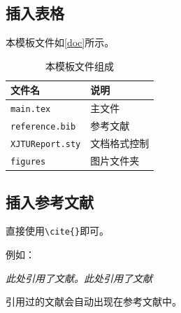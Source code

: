 \documentclass[12pt,hyperref,a4paper,UTF8]{ctexart}
\begin{document}

\subsection{插入表格}
本模板文件如\autoref{doc}所示。
\begin{table}[!htbp]
    \centering
    \begin{tabular}{l  | l}
    \hline
        文件名 & 说明 \\
        \hline
        \texttt{main.tex}  & 主文件 \\
        \texttt{reference.bib} & 参考文献 \\
        \texttt{XJTUReport.sty}  & 文档格式控制\\
        \texttt{figures}  & 图片文件夹 \\
        \hline
    \end{tabular}
    \caption{本模板文件组成}
    \label{doc}
\end{table}

%
%
%
%
%
%

\subsection{插入参考文献}
直接使用\verb|\cite{}|即可。

例如：


   \textit{ 此处引用了文献\cite{OFDMAbackscatter}。此处引用了文献\cite{DigiScatter}}


引用过的文献会自动出现在参考文献中。
\end{document}
